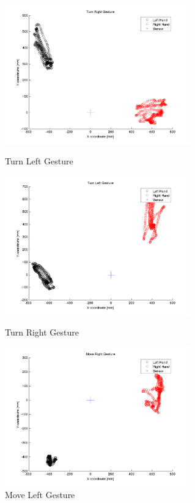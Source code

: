 \begin{figure}	 	
	\begin{minipage}
		{.45 
		\textwidth}  
		\includegraphics[height=60mm]{figures/result/plot-ges-2.png} \caption{Turn Left Gesture} \label{pl:ges:2} 
	\end{minipage}
	\begin{minipage}
		{.45 
		\textwidth}  
		\includegraphics[height=60mm]{figures/result/plot-ges-3.png} \caption{Turn Right Gesture} \label{pl:ges:3} 
	\end{minipage}
	\begin{minipage}
		{.45 
		\textwidth}  
		\includegraphics[height=60mm]{figures/result/plot-ges-4.png} \caption{Move Left Gesture} \label{pl:ges:4} 
	\end{minipage}
	\begin{minipage}

\end{minipage}
\end{figure}
